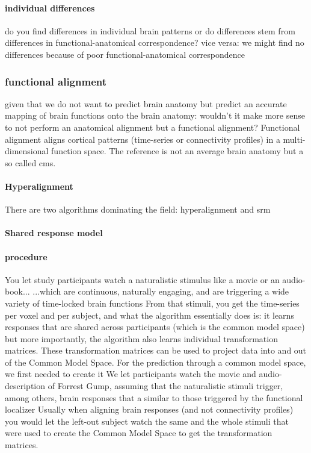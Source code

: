 \paragraph{individual differences}
%
do you find differences in individual brain patterns or do differences stem from
differences in functional-anatomical correspondence?
%
vice versa: we might find no differences because of poor functional-anatomical
correspondence


\subsubsection{functional alignment}
%
given that we do not want to predict brain anatomy but predict an accurate
mapping of brain functions onto the brain anatomy:
%
wouldn't it make more sense to not perform an anatomical alignment but a
functional alignment?
%
Functional alignment aligns cortical patterns (time-series or connectivity
profiles) in a multi-dimensional function space.
The reference is not an average brain anatomy but a so called \ac{cms}.


\paragraph{Hyperalignment}
%
There are two algorithms dominating the field: hyperalignment and \ac{srm}


\paragraph{Shared response model}
%


\paragraph{procedure}
%
You let study participants watch a naturalistic stimulus like a movie or an
audio-book...  ...which are continuous, naturally engaging, and are triggering a
wide variety of time-locked brain functions
%
From that stimuli, you get the time-series per voxel and per subject, and what
the algorithm essentially does is: it learns responses that are shared across
participants (which is the common model space)
%
but more importantly, the algorithm also learns individual transformation
matrices.
%
These transformation matrices can be used to project data into and out of the
Common Model Space.
For the prediction through a common model space, we first needed to create it
%
We let participants watch the movie and audio-description of Forrest Gump,
assuming that the naturalistic stimuli trigger, among others, brain responses
that a similar to those triggered by the functional localizer
%
Usually when aligning brain responses (and not connectivity profiles) you would
let the left-out subject watch the same and the whole stimuli that were used to
create the Common Model Space to get the transformation matrices.




